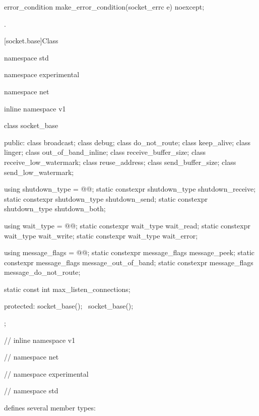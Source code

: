 %
%
\begin{itemdecl}
error_condition make_error_condition(socket_errc e) noexcept;
\end{itemdecl}

\begin{itemdescr}
\pnum
\returns {}.
\end{itemdescr}



%
[socket.base]{Class }

\begin{codeblock}
namespace std {
namespace experimental {
namespace net {
inline namespace v1 {

  class socket_base
  {
  public:
    class broadcast;
    class debug;
    class do_not_route;
    class keep_alive;
    class linger;
    class out_of_band_inline;
    class receive_buffer_size;
    class receive_low_watermark;
    class reuse_address;
    class send_buffer_size;
    class send_low_watermark;

    using shutdown_type = @@;
    static constexpr shutdown_type shutdown_receive;
    static constexpr shutdown_type shutdown_send;
    static constexpr shutdown_type shutdown_both;

    using wait_type = @@;
    static constexpr wait_type wait_read;
    static constexpr wait_type wait_write;
    static constexpr wait_type wait_error;

    using message_flags = @@;
    static constexpr message_flags message_peek;
    static constexpr message_flags message_out_of_band;
    static constexpr message_flags message_do_not_route;

    static const int max_listen_connections;

  protected:
    socket_base();
    ~socket_base();
  };

} // inline namespace v1
} // namespace net
} // namespace experimental
} // namespace std
\end{codeblock}

\pnum
{} defines several member types:

